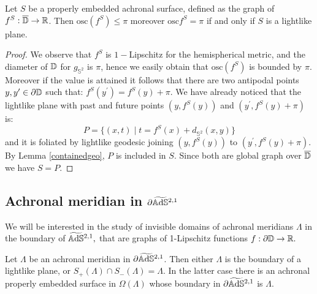 \begin{lemma}\label{417}
    Let $S$ be a properly embedded achronal surface, defined as the graph of $f^S:\overline{\mathbb{D}}\to\mathbb{R}$. Then $\text{osc}(f^S)\leq\pi$ moreover $\text{osc}f^S=\pi$ if and only if $S$ is a lightlike plane. 
\end{lemma}
\begin{proof}
    We observe that $f^S$ is $1-$Lipschitz for the hemispherical metric, and the diameter of $\mathbb{D}$ for $g_{\mathbb{S}^2}$ is $\pi$, hence we easily obtain that $\text{osc}(f^S)$ is bounded by $\pi$. Moreover if the value is attained it follows that there are two antipodal points $y,y^{\prime} \in \partial\mathbb{D}$ such that: $f^S(y^{\prime})=f^S(y)+\pi$. We have already noticed that the lightlike plane with past and future points $(y,f^S(y))$ and $(y^{\prime},f^S(y)+\pi)$ is: 
    \[
        P=\{(x,t)\;|\;t=f^S(x)+d_{\mathbb{S}^2}(x,y)\}
    \]
    and it is foliated by lightlike geodesic joining $(y,f^S(y))$ to $(y^{\prime},f^S(y)+\pi)$. By Lemma \ref{containedgeo}, $P$ is included in $S$. Since both are global graph over $\overline{\mathbb{D}}$ we have $S=P$.
\end{proof}

\subsection{Achronal meridian in $\partial\widetilde{\mathbb{A}\mathrm{d}\mathbb{S}}{}^{2,1}$}
We will be interested in the study of invisible domains of achronal meridians $\Lambda$ in the boundary of $\widetilde{\mathbb{A}\mathrm{d}\mathbb{S}}{}^{2,1},$ that are graphs of 1-Lipschitz functions $f:\partial\mathbb{D}\to\mathbb{R}.$

\begin{lemma}\label{431}
    Let $\Lambda$ be an achronal meridian in $\partial\widetilde{\mathbb{A}\mathrm{d}\mathbb{S}}{}^{2,1}$. Then either $\Lambda$ is the boundary of a lightlike plane, or $S_+(\Lambda)\cap S_-(\Lambda)=\Lambda.$ In the latter case there is an achronal properly embedded surface in $\Omega(\Lambda)$ whose boundary in $\partial\widetilde{\mathbb{A}\mathrm{d}\mathbb{S}}{}^{2,1}$ is $\Lambda$.  
\end{lemma}

